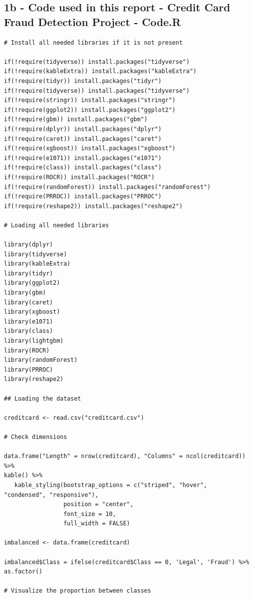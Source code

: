 \documentclass[]{article}
\begin{document}
\hypertarget{b---code-used-in-this-report---credit-card-fraud-detection-project---code.r}{%
\subsection{1b - Code used in this report - Credit Card Fraud Detection
Project -
Code.R}\label{b---code-used-in-this-report---credit-card-fraud-detection-project---code.r}}

\begin{verbatim}
# Install all needed libraries if it is not present

if(!require(tidyverse)) install.packages("tidyverse") 
if(!require(kableExtra)) install.packages("kableExtra")
if(!require(tidyr)) install.packages("tidyr")
if(!require(tidyverse)) install.packages("tidyverse")
if(!require(stringr)) install.packages("stringr")
if(!require(ggplot2)) install.packages("ggplot2")
if(!require(gbm)) install.packages("gbm")
if(!require(dplyr)) install.packages("dplyr")
if(!require(caret)) install.packages("caret")
if(!require(xgboost)) install.packages("xgboost")
if(!require(e1071)) install.packages("e1071")
if(!require(class)) install.packages("class")
if(!require(ROCR)) install.packages("ROCR")
if(!require(randomForest)) install.packages("randomForest")
if(!require(PRROC)) install.packages("PRROC")
if(!require(reshape2)) install.packages("reshape2")

# Loading all needed libraries

library(dplyr)
library(tidyverse)
library(kableExtra)
library(tidyr)
library(ggplot2)
library(gbm)
library(caret)
library(xgboost)
library(e1071)
library(class)
library(lightgbm)
library(ROCR)
library(randomForest)
library(PRROC)
library(reshape2)

## Loading the dataset

creditcard <- read.csv("creditcard.csv")

# Check dimensions

data.frame("Length" = nrow(creditcard), "Columns" = ncol(creditcard)) %>%
kable() %>%
   kable_styling(bootstrap_options = c("striped", "hover", "condensed", "responsive"),
                 position = "center",
                 font_size = 10,
                 full_width = FALSE)
                 
imbalanced <- data.frame(creditcard)

imbalanced$Class = ifelse(creditcard$Class == 0, 'Legal', 'Fraud') %>% as.factor()

# Visualize the proportion between classes


\end{verbatim}
\end{document}
